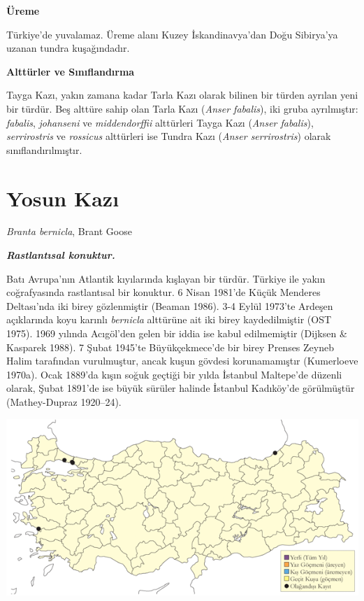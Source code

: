 \documentclass[
  letterpaper,
  DIV=11,
  numbers=noendperiod]{scrreprt}
\begin{document}
\textbf{Üreme}

Türkiye'de yuvalamaz. Üreme alanı Kuzey İskandinavya'dan Doğu Sibirya'ya
uzanan tundra kuşağındadır.

\textbf{Alttürler ve Sınıflandırma}

Tayga Kazı, yakın zamana kadar Tarla Kazı olarak bilinen bir türden
ayrılan yeni bir türdür. Beş alttüre sahip olan Tarla Kazı (\emph{Anser
fabalis}), iki gruba ayrılmıştır: \emph{fabalis}, \emph{johanseni} ve
\emph{middendorffii} alttürleri Tayga Kazı (\emph{Anser fabalis}),
\emph{serrirostris} ve \emph{rossicus} alttürleri ise Tundra Kazı
(\emph{Anser serrirostris}) olarak sınıflandırılmıştır.

\section{Yosun Kazı}\label{yosun-kazux131}

\emph{Branta bernicla}, Brant Goose

\textbf{\emph{Rastlantısal konuktur.}}

Batı Avrupa'nın Atlantik kıyılarında kışlayan bir türdür. Türkiye ile
yakın coğrafyasında rastlantısal bir konuktur. 6 Nisan 1981'de Küçük
Menderes Deltası'nda iki birey gözlenmiştir (Beaman 1986). 3-4 Eylül
1973'te Ardeşen açıklarında koyu karınlı \emph{bernicla} alttürüne ait
iki birey kaydedilmiştir (OST 1975). 1969 yılında Acıgöl'den gelen bir
iddia ise kabul edilmemiştir (Dijksen \& Kasparek 1988). 7 Şubat 1945'te
Büyükçekmece'de bir birey Prenses Zeyneb Halim tarafından vurulmuştur,
ancak kuşun gövdesi korunamamıştır (Kumerloeve 1970a). Ocak 1889'da
kışın soğuk geçtiği bir yılda İstanbul Maltepe'de düzenli olarak, Şubat
1891'de ise büyük sürüler halinde İstanbul Kadıköy'de görülmüştür
(Mathey-Dupraz 1920--24).

\includegraphics{images/harita_Page_005.png}
\end{document}
